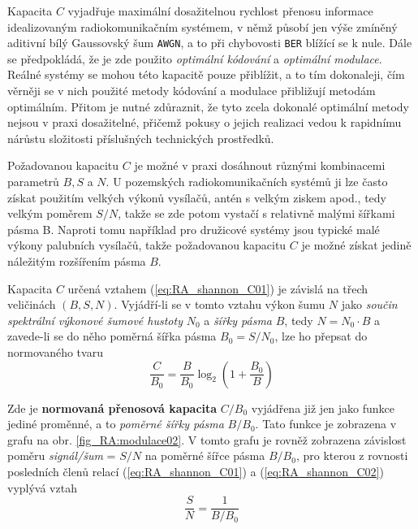      Kapacita \(C\) vyjadřuje maximální dosažitelnou rychlost přenosu informace idealizovaným 
      radiokomunikačním systémem, v němž působí jen výše zmíněný aditivní bílý Gaussovský šum 
      \texttt{AWGN}, a to při chybovosti \texttt{BER} blížící se k nule. Dále se předpokládá, že je 
      zde použito \emph{optimální kódování} a \emph{optimální modulace}. Reálné systémy se mohou 
      této kapacitě pouze přiblížit, a to tím dokonaleji, čím věrněji se v nich použité metody 
      kódování a modulace přibližují metodám optimálním. Přitom je nutné zdůraznit, že tyto zcela 
      dokonalé optimální metody nejsou v praxi dosažitelné, přičemž pokusy o jejich realizaci vedou 
      k rapidnímu nárůstu složitosti příslušných technických prostředků.
      
      Požadovanou kapacitu \(C\) je možné v praxi dosáhnout různými kombinacemi parametrů \(B, S\) 
      a \(N\). U pozemských radiokomunikačních systémů ji lze často získat použitím velkých výkonů 
      vysílačů, antén s velkým ziskem apod., tedy velkým poměrem \(S/N\), takže se zde potom 
      vystačí s relativně malými šířkami pásma B. Naproti tomu například pro družicové systémy jsou 
      typické malé výkony palubních vysílačů, takže požadovanou kapacitu \(C\) je možné získat 
      jedině náležitým rozšířením pásma \(B\).
      
      Kapacita \(C\) určená vztahem (\ref{eq:RA_shannon_C01}) je závislá na třech veličinách \((B, 
      S, N)\). Vyjádří-li se v tomto vztahu výkon šumu \(N\) jako \emph{součin spektrální výkonové 
      šumové hustoty} \(N_0\) a \emph{šířky pásma} \(B\), tedy \(N = N_0\cdot B\) a zavede-li se do 
      něho poměrná šířka pásma \(B_0 = S/N_0\), lze ho přepsat do normovaného tvaru 
      \begin{equation}\label{eq:RA_shannon_C02}
        \frac{C}{B_0} = \frac{B}{B_0}\log_2\left(1+\frac{B_0}{B}\right)
      \end{equation}
      
      Zde je \textbf{normovaná přenosová kapacita} \(C/B_0\) vyjádřena již jen jako funkce jediné 
      proměnné, a to \emph{poměrné šířky pásma} \(B/B_0\). Tato funkce je zobrazena v grafu na obr. 
      \ref{fig_RA:modulace02}. V tomto grafu je rovněž zobrazena závislost poměru \emph{signál/šum} 
      = \(S/N\) na poměrné šířce pásma \(B/B_0\), pro kterou z rovnosti posledních členů relací 
      (\ref{eq:RA_shannon_C01}) a (\ref{eq:RA_shannon_C02}) vyplývá vztah      
      \begin{equation}\label{eq:RA_shannon_C03}
        \frac{S}{N} = \frac{1}{B/B_0}
      \end{equation}      
      
